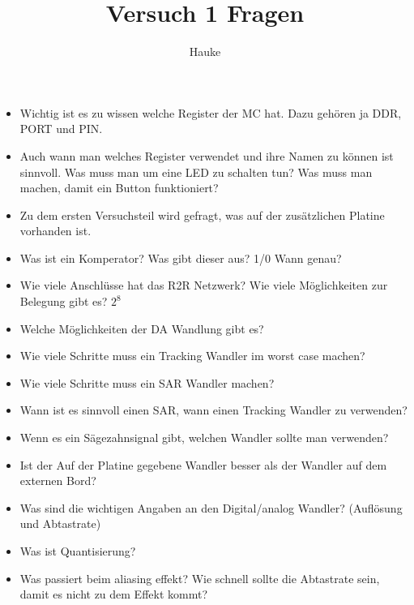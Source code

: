 \documentclass[12pt,a4paper]{article}
\title{Versuch 1 Fragen}
\author{
        Hauke
}
\begin{document}
\maketitle
\begin{itemize}
    \item Wichtig ist es zu wissen welche Register der MC hat. Dazu gehören ja DDR, PORT und PIN.
    \item Auch wann man welches Register verwendet und ihre Namen zu können ist sinnvoll. Was muss man um eine LED zu schalten tun? Was muss man machen, damit ein Button funktioniert?
    \item Zu dem ersten Versuchsteil wird gefragt, was auf der zusätzlichen Platine vorhanden ist.
    \item Was ist ein Komperator? Was gibt dieser aus? 1/0 Wann genau?
    \item Wie viele Anschlüsse hat das R2R Netzwerk? Wie viele Möglichkeiten zur Belegung gibt es? $2^8$
    \item Welche Möglichkeiten der DA Wandlung gibt es? 
    \item Wie viele Schritte muss ein Tracking Wandler im worst case machen?
    \item Wie viele Schritte muss ein SAR Wandler machen?
    \item Wann ist es sinnvoll einen SAR, wann einen Tracking Wandler zu verwenden?
    \item Wenn es ein Sägezahnsignal gibt, welchen Wandler sollte man verwenden?
    \item Ist der Auf der Platine gegebene Wandler besser als der Wandler auf dem externen Bord?
    \item Was sind die wichtigen Angaben an den Digital/analog Wandler? (Auflösung und Abtastrate)
    \item Was ist Quantisierung?
    \item Was passiert beim aliasing effekt? Wie schnell sollte die Abtastrate sein, damit es nicht zu dem Effekt kommt?
\end{itemize}
\end{document}
